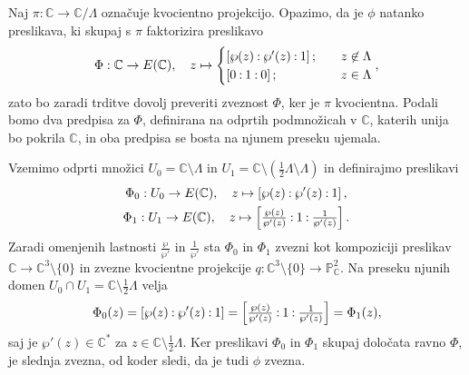\documentclass[mat1]{fmfdelo}
\numberwithin{equation}{section}
\newcommand{\C}{\mathbb C}
\newcommand{\CM}{\mathbb C ^*}
\newcommand{\PC}{\mathbb{P}^2_\C}
\newcommand{\oio}{\pcoor{0: 1 : 0}}
\newcommand{\torus}{\C/\Lambda}
\newcommand{\pcoor}[1]{%
\begingroup\lccode`~=`: \lowercase{\endgroup
\edef~}{\mathbin{\mathchar\the\mathcode`:}\nobreak}%
\left[%
\begingroup
\mathcode`:=\string"8000
#1%
\endgroup
\right]%
}
\theoremstyle{definition}
\begin{document}
\begin{dokaz}
    
    Naj $\pi : \C \to \torus$ označuje kvocientno projekcijo. Opazimo, da je $\phi$ natanko preslikava, ki skupaj s $\pi$ faktorizira  preslikavo
    \[
        \Phi: \C \to E(\C), \quad z \mapsto
        \begin{cases}
            \pcoor{\wp(z) : \wp'(z) : 1}; \quad &z \not\in \Lambda \\
            \oio; \quad &z \in \Lambda
        \end{cases}, 
    \]
    zato bo zaradi trditve \cite[trditev 3.22]{MrcunTop} dovolj preveriti zveznost $\Phi$, ker je $\pi$ kvocientna. Podali bomo dva predpisa za $\Phi$, definirana na odprtih podmnožicah v $\C$, katerih unija bo pokrila $\C$, in oba predpisa se bosta na njunem preseku ujemala. 
    
    Vzemimo odprti množici $U_0 = \C \setminus \Lambda$ in $U_1 = \C \setminus (\frac12\Lambda \setminus \Lambda)$ in definirajmo preslikavi
    \begin{gather*}
        \Phi_0 : U_0 \to E(\C), \quad z \mapsto \pcoor{\wp(z) : \wp'(z) : 1}, \\
        \Phi_1 : U_1 \to E(\C), \quad z \mapsto \pcoor{\tfrac{\wp(z)}{\wp'(z)} : 1 : \tfrac{1}{\wp'(z)}}.
    \end{gather*}
    Zaradi omenjenih lastnosti $\tfrac{\wp}{\wp'}$ in $\tfrac{1}{\wp'}$ sta $\Phi_0$ in $\Phi_1$ zvezni kot kompoziciji preslikav $\C \to \C^3\setminus\{0\}$ in zvezne kvocientne projekcije $q:\C^3\setminus\{0\} \to \PC$. Na preseku njunih domen $U_0 \cap U_1 = \C \setminus \frac12\Lambda$ velja
    \[
        \Phi_0(z) = \pcoor{\wp(z) : \wp'(z) : 1} = 
        \pcoor{\tfrac{\wp(z)}{\wp'(z)} : 1 : \tfrac{1}{\wp'(z)}} = \Phi_1(z),
    \]
    saj je $\wp'(z) \in \CM$ za $z \in \C \setminus \frac12\Lambda$. Ker preslikavi $\Phi_0$ in $\Phi_1$ skupaj določata ravno $\Phi$, je slednja zvezna, od koder sledi, da je tudi $\phi$ zvezna.  
     
    
    

\end{dokaz}
\end{document}
